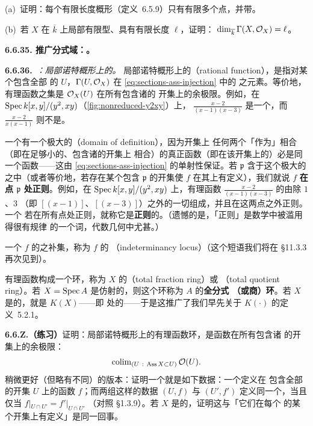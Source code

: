 (a)~证明：每个有限长度概形（定义~6.5.9）只有有限多个点，并带\trDiscreteTopology。

(b)~若 $X$ 在 $\overline{k}$ 上局部有限型、具有有限长度 $\ell$，证明：
$\dim_{\overline{k}}\Gamma(X,\mathcal{O}_X)=\ell$。

\textbf{6.6.35. 推广分式域：\trTotalFractionRing{}。}

\textbf{6.6.36.}\ \emph{\trhDefinition{}：局部诺特概形上的\trRationalFunction。}\quad
局部诺特概形上的\textbf{\trRationalFunction}（rational function），是指对某个包含全部%
\trAssociatedPoint{}的 $U$，$\Gamma(U,\mathcal{O}_X)$ 在 \eqref{eq:sections-ass-injection} 中的%
\trImage{}之元素。等价地，有理函数之集是 $\mathcal{O}_X(U)$ 在所有包含诸\trAssociatedPoint{}的
开集上的余极限。例如，在 $\operatorname{Spec} k[x,y]/(y^2,xy)$（\cref{fig:nonreduced-y2xy}）上，
$\frac{x-2}{(x-1)(x-3)}$ 是一个\trRationalFunction，而 $\frac{x-2}{x(x-1)}$ 则不是。

一个\trRationalFunction{}有一个极大的\textbf{\trDomainOfDefinition{}}（domain of definition），因为开集上
任何两个「作为\trRationalFunction」相合（即在足够小的、包含诸\trAssociatedPoint{}的开集上
相合）的真正函数（即\trStructureSheaf{}在该开集上的\trSection）必是同一个函数——这由
\eqref{eq:sections-ass-injection} 的单射性保证。若 $\mathfrak{p}$ 含于这个极大的\trDomainOfDefinition{}
之中（或者等价地，若存在某个包含 $\mathfrak{p}$ 的开集使 $f$ 在其上有定义），我们就说%
\trRationalFunction{} $f$ \textbf{在点 $\mathfrak{p}$ 处正则}。例如，在
$\operatorname{Spec} k[x,y]/(y^2,xy)$ 上，有理函数 $\frac{x-2}{(x-1)(x-3)}$ 的\trDomainOfDefinition{}由除 $1$、$3$
（即 $[(x-1)]$、$[(x-3)]$）之外的一切组成，并且在这两点之外正则。一个\trRationalFunction{}%
若在所有点处正则，就称它是\textbf{正则}的。（遗憾的是，「正则」是数学中被滥用得很有规律
的一个词，代数几何中尤甚。）

一个\trRationalFunction{} $f$ 的\trDomainOfDefinition{}之补集，称为 $f$ 的\textbf{\trIndeterminacyLocus{}}%
（indeterminancy locus）（这个短语我们将在 \S11.3.3 再次见到）。

有理函数构成一个环，称为 $X$ 的\textbf{\trTotalFractionRing{}}（total fraction ring）或\textbf{\trTotalQuotientRing{}}
（total quotient ring）。若 $X=\operatorname{Spec} A$ 是仿射的，则这个环称为 $A$ 的\textbf{全分式
（或商）环}。若 $X$ 是\trIntegral{}的，\trTotalFractionRing{}就是\trFunctionField{} $K(X)$——即%
\trGenericPoint{}处的\trStalk{}——于是这推广了我们早先关于 $K(\cdot)$ 的定义~5.2.1。

\textbf{6.6.Z.（练习）}\quad 证明：局部诺特概形上的有理函数环，是函数在所有包含诸%
\trAssociatedPoint{}的开集上的余极限：
\[
\colim_{(U\ :\ \operatorname{Ass}X\subset U)}\OO(U).
\]
稍微更好（但略有不同）的版本：证明一个\trRationalFunction{}就是如下数据：一个定义在
包含全部\trAssociatedPoint{}的开集 $U$ 上的函数 $f$；而两组这样的数据 $(U,f)$ 与
$(U',f')$ 定义同一个\trRationalFunction，当且仅当 $f|_{U\cap U'}=f'|_{U\cap U'}$
（对照 \S1.3.9）。若 $X$ 是\trReduced{}的，证明这与「它们在每个\trIrreducibleComponent{}
的某个开集上有定义」是同一回事。


